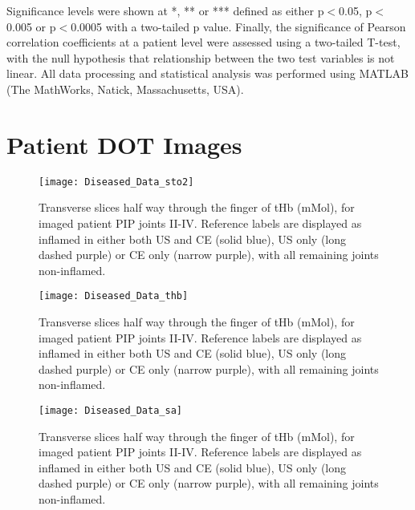 \documentclass[twoside]{bhamthesis}
\theoremstyle{definition}
\begin{document}
Significance levels were shown at *, ** or *** defined as either p$<$0.05, p$<$0.005 or  p$<$0.0005 with a two-tailed p value. Finally, the significance of Pearson correlation coefficients at a patient level were assessed using a two-tailed T-test, with the null hypothesis that relationship between the two test variables is not linear. All data processing and statistical analysis was performed using MATLAB (The MathWorks, Natick, Massachusetts, USA).



\section{Patient DOT Images}

\begin{figure}[!ht]
\centering\texttt{[image: Diseased\_Data\_sto2]}
\caption{Transverse slices half way through the finger of tHb (mMol), for imaged patient PIP joints II-IV. Reference labels are displayed as inflamed in either both US and CE (solid blue), US only (long dashed purple) or CE only (narrow purple), with all remaining joints non-inflamed.}
\label{fig:Diseased_Data_sto2}
\end{figure}

\begin{figure}[!ht]
\centering\texttt{[image: Diseased\_Data\_thb]}
\caption{Transverse slices half way through the finger of tHb (mMol), for imaged patient PIP joints II-IV. Reference labels are displayed as inflamed in either both US and CE (solid blue), US only (long dashed purple) or CE only (narrow purple), with all remaining joints non-inflamed.}
\label{fig:Diseased_Data_thb}
\end{figure}

\begin{figure}[!ht]
\centering\texttt{[image: Diseased\_Data\_sa]}
\caption{Transverse slices half way through the finger of tHb (mMol), for imaged patient PIP joints II-IV. Reference labels are displayed as inflamed in either both US and CE (solid blue), US only (long dashed purple) or CE only (narrow purple), with all remaining joints non-inflamed.}
\label{fig:Diseased_Data_sa}
\end{figure}
\end{document}
